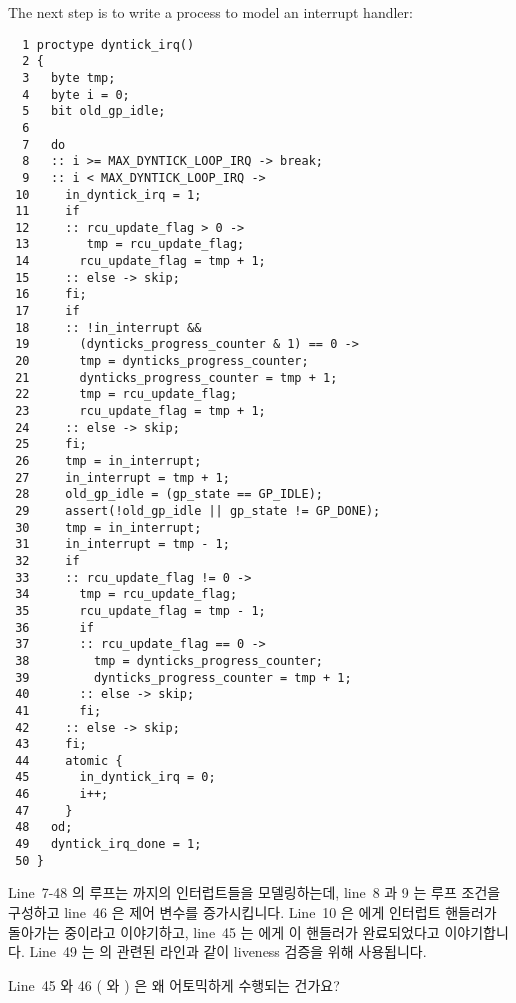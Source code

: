 The next step is to write a  process
to model an interrupt handler:
\fi

{ \scriptsize
\begin{verbatim}
  1 proctype dyntick_irq()
  2 {
  3   byte tmp;
  4   byte i = 0;
  5   bit old_gp_idle;
  6
  7   do
  8   :: i >= MAX_DYNTICK_LOOP_IRQ -> break;
  9   :: i < MAX_DYNTICK_LOOP_IRQ ->
 10     in_dyntick_irq = 1;
 11     if
 12     :: rcu_update_flag > 0 ->
 13        tmp = rcu_update_flag;
 14       rcu_update_flag = tmp + 1;
 15     :: else -> skip;
 16     fi;
 17     if
 18     :: !in_interrupt &&
 19       (dynticks_progress_counter & 1) == 0 ->
 20       tmp = dynticks_progress_counter;
 21       dynticks_progress_counter = tmp + 1;
 22       tmp = rcu_update_flag;
 23       rcu_update_flag = tmp + 1;
 24     :: else -> skip;
 25     fi;
 26     tmp = in_interrupt;
 27     in_interrupt = tmp + 1;
 28     old_gp_idle = (gp_state == GP_IDLE);
 29     assert(!old_gp_idle || gp_state != GP_DONE);
 30     tmp = in_interrupt;
 31     in_interrupt = tmp - 1;
 32     if
 33     :: rcu_update_flag != 0 ->
 34       tmp = rcu_update_flag;
 35       rcu_update_flag = tmp - 1;
 36       if
 37       :: rcu_update_flag == 0 ->
 38         tmp = dynticks_progress_counter;
 39         dynticks_progress_counter = tmp + 1;
 40       :: else -> skip;
 41       fi;
 42     :: else -> skip;
 43     fi;
 44     atomic {
 45       in_dyntick_irq = 0;
 46       i++;
 47     }
 48   od;
 49   dyntick_irq_done = 1;
 50 }
\end{verbatim}
}

Line~7-48 의 루프는  까지의 인터럽트들을 모델링하는데,
line~8 과 9 는 루프 조건을 구성하고 line~46 은 제어 변수를 증가시킵니다.
Line~10 은  에게 인터럽트 핸들러가 돌아가는 중이라고
이야기하고, line~45 는  에게 이 핸들러가 완료되었다고
이야기합니다.
Line~49 는  의 관련된 라인과 같이 liveness 검증을 위해
사용됩니다.
\iffalse

The loop from lines~7-48 models up to \co{MAX_DYNTICK_LOOP_IRQ}
interrupts, with lines~8 and~9 forming the loop condition and line~46
incrementing the control variable.
Line~10 tells \co{dyntick_nohz()} that an interrupt handler
is running, and line~45 tells \co{dyntick_nohz()} that this
handler has completed.
Line~49 is used for liveness verification, just like the corresponding
line of \co{dyntick_nohz()}.
\fi

\QuickQuiz{}
	Line~45 와 46 ( 와 ) 은 왜 어토믹하게
	수행되는 건가요?
	\iffalse

